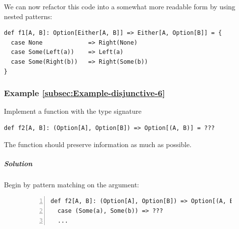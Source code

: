 We can now refactor this code into a somewhat more readable form by
using nested patterns: 
\begin{lstlisting}
def f1[A, B]: Option[Either[A, B]] => Either[A, Option[B]] = {
  case None             => Right(None)
  case Some(Left(a))    => Left(a)
  case Some(Right(b))   => Right(Some(b))
}
\end{lstlisting}


\subsubsection{Example \label{subsec:Example-disjunctive-6}\ref{subsec:Example-disjunctive-6}}

Implement a function with the type signature 
\begin{lstlisting}
def f2[A, B]: (Option[A], Option[B]) => Option[(A, B)] = ???
\end{lstlisting}
The function should preserve information as much as possible.

\subparagraph{Solution}

Begin by pattern matching on the argument:

\begin{figure}%
\vspace{-0.6\baselineskip}
\begin{lstlisting}[numbers=left]
def f2[A, B]: (Option[A], Option[B]) => Option[(A, B)] = {
  case (Some(a), Some(b)) => ???
  ...
\end{lstlisting}

\vspace{-0.8\baselineskip}
\end{figure}%

